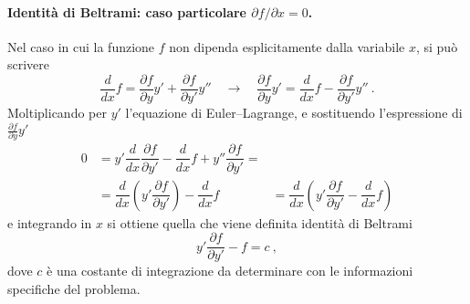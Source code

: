 \paragraph{Identità di Beltrami: caso particolare $\partial f/\partial x = 0$.}
Nel caso in cui la funzione $f$ non dipenda esplicitamente dalla variabile $x$, si può scrivere
\begin{equation}
    \dfrac{d}{dx} f = \dfrac{\partial f}{\partial y} y' +  \dfrac{\partial f}{\partial y'} y'' \quad \rightarrow \quad
    \dfrac{\partial f}{\partial y} y' = \dfrac{d}{dx} f -  \dfrac{\partial f}{\partial y'} y''  \ .
\end{equation}
Moltiplicando per $y'$ l'equazione di Euler--Lagrange, e sostituendo l'espressione di $\frac{\partial f}{\partial y} y'$
\begin{equation}
\begin{aligned}
    0 & = y' \dfrac{d}{dx} \dfrac{\partial f}{\partial y'} - \dfrac{d}{dx} f + y'' \dfrac{\partial f}{\partial y'} = \\
      & = \dfrac{d}{dx} \left( y' \dfrac{\partial f}{\partial y'} \right) - \dfrac{d}{dx} f 
      & = \dfrac{d}{dx} \left( y' \dfrac{\partial f}{\partial y'} - \dfrac{d}{dx} f \right)
\end{aligned}
\end{equation}
e integrando in $x$ si ottiene quella che viene definita identità di Beltrami
\begin{equation}
    y' \dfrac{\partial f}{\partial y'} - f = c \ , 
\end{equation}
dove $c$ è una costante di integrazione da determinare con le informazioni specifiche del problema.

